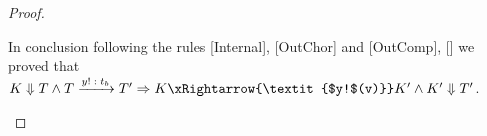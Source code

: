 \begin{proof}
\begin{itemize}
\begin{itemize}
    
    
    
    
    \end{itemize}
    
    In conclusion following the rules [Internal], [OutChor] and [OutComp], [] we proved that   $K \Downarrow T \wedge T\xrightarrow{\textit{$y!:t_b$}}T' \Rightarrow K\xRightarrow{\textit{$y!$(v)}}K' \wedge K'\Downarrow T'$.
    
    
    
    
    
    
    
    
    
    
    
\end{itemize}






\end{proof}

